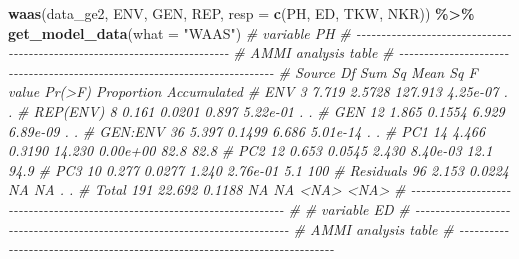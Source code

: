 \documentclass[
]{book}
\newenvironment{Shaded}{\begin{snugshade}}{\end{snugshade}}
\newcommand{\CommentTok}[1]{\textcolor[rgb]{0.56,0.35,0.01}{\textit{#1}}}
\newcommand{\DataTypeTok}[1]{\textcolor[rgb]{0.13,0.29,0.53}{#1}}
\newcommand{\KeywordTok}[1]{\textcolor[rgb]{0.13,0.29,0.53}{\textbf{#1}}}
\newcommand{\NormalTok}[1]{#1}
\newcommand{\OperatorTok}[1]{\textcolor[rgb]{0.81,0.36,0.00}{\textbf{#1}}}
\newcommand{\StringTok}[1]{\textcolor[rgb]{0.31,0.60,0.02}{#1}}
\numberwithin{equation}{section}
\begin{document}
\begin{Shaded}
\begin{Highlighting}[]
\KeywordTok{waas}\NormalTok{(data\_ge2, ENV, GEN, REP,}
     \DataTypeTok{resp =} \KeywordTok{c}\NormalTok{(PH, ED, TKW, NKR)) }\OperatorTok{\%\textgreater{}\%}
\StringTok{ }\KeywordTok{get\_model\_data}\NormalTok{(}\DataTypeTok{what =} \StringTok{"WAAS"}\NormalTok{)}
\CommentTok{\# variable PH }
\CommentTok{\# {-}{-}{-}{-}{-}{-}{-}{-}{-}{-}{-}{-}{-}{-}{-}{-}{-}{-}{-}{-}{-}{-}{-}{-}{-}{-}{-}{-}{-}{-}{-}{-}{-}{-}{-}{-}{-}{-}{-}{-}{-}{-}{-}{-}{-}{-}{-}{-}{-}{-}{-}{-}{-}{-}{-}{-}{-}{-}{-}{-}{-}{-}{-}{-}{-}{-}{-}{-}{-}{-}{-}{-}{-}{-}{-}}
\CommentTok{\# AMMI analysis table}
\CommentTok{\# {-}{-}{-}{-}{-}{-}{-}{-}{-}{-}{-}{-}{-}{-}{-}{-}{-}{-}{-}{-}{-}{-}{-}{-}{-}{-}{-}{-}{-}{-}{-}{-}{-}{-}{-}{-}{-}{-}{-}{-}{-}{-}{-}{-}{-}{-}{-}{-}{-}{-}{-}{-}{-}{-}{-}{-}{-}{-}{-}{-}{-}{-}{-}{-}{-}{-}{-}{-}{-}{-}{-}{-}{-}{-}{-}}
\CommentTok{\#     Source  Df Sum Sq Mean Sq F value   Pr(\textgreater{}F) Proportion Accumulated}
\CommentTok{\#        ENV   3  7.719  2.5728 127.913 4.25e{-}07          .           .}
\CommentTok{\#   REP(ENV)   8  0.161  0.0201   0.897 5.22e{-}01          .           .}
\CommentTok{\#        GEN  12  1.865  0.1554   6.929 6.89e{-}09          .           .}
\CommentTok{\#    GEN:ENV  36  5.397  0.1499   6.686 5.01e{-}14          .           .}
\CommentTok{\#        PC1  14  4.466  0.3190  14.230 0.00e+00       82.8        82.8}
\CommentTok{\#        PC2  12  0.653  0.0545   2.430 8.40e{-}03       12.1        94.9}
\CommentTok{\#        PC3  10  0.277  0.0277   1.240 2.76e{-}01        5.1         100}
\CommentTok{\#  Residuals  96  2.153  0.0224      NA       NA          .           .}
\CommentTok{\#      Total 191 22.692  0.1188      NA       NA       \textless{}NA\textgreater{}        \textless{}NA\textgreater{}}
\CommentTok{\# {-}{-}{-}{-}{-}{-}{-}{-}{-}{-}{-}{-}{-}{-}{-}{-}{-}{-}{-}{-}{-}{-}{-}{-}{-}{-}{-}{-}{-}{-}{-}{-}{-}{-}{-}{-}{-}{-}{-}{-}{-}{-}{-}{-}{-}{-}{-}{-}{-}{-}{-}{-}{-}{-}{-}{-}{-}{-}{-}{-}{-}{-}{-}{-}{-}{-}{-}{-}{-}{-}{-}{-}{-}{-}{-}}
\CommentTok{\# }
\CommentTok{\# variable ED }
\CommentTok{\# {-}{-}{-}{-}{-}{-}{-}{-}{-}{-}{-}{-}{-}{-}{-}{-}{-}{-}{-}{-}{-}{-}{-}{-}{-}{-}{-}{-}{-}{-}{-}{-}{-}{-}{-}{-}{-}{-}{-}{-}{-}{-}{-}{-}{-}{-}{-}{-}{-}{-}{-}{-}{-}{-}{-}{-}{-}{-}{-}{-}{-}{-}{-}{-}{-}{-}{-}{-}{-}{-}{-}{-}{-}{-}{-}}
\CommentTok{\# AMMI analysis table}
\CommentTok{\# {-}{-}{-}{-}{-}{-}{-}{-}{-}{-}{-}{-}{-}{-}{-}{-}{-}{-}{-}{-}{-}{-}{-}{-}{-}{-}{-}{-}{-}{-}{-}{-}{-}{-}{-}{-}{-}{-}{-}{-}{-}{-}{-}{-}{-}{-}{-}{-}{-}{-}{-}{-}{-}{-}{-}{-}{-}{-}{-}{-}{-}{-}{-}{-}{-}{-}{-}{-}{-}{-}{-}{-}{-}{-}{-}}

\end{Highlighting}
\end{Shaded}
\end{document}
